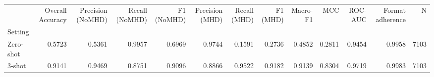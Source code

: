 \begin{tabular}{lrrrrrrrrrrrr}
\toprule
 & Overall Accuracy & Precision (NoMHD) & Recall (NoMHD) & F1 (NoMHD) & Precision (MHD) & Recall (MHD) & F1 (MHD) & Macro-F1 & MCC & ROC-AUC & Format adherence & N \\
Setting &  &  &  &  &  &  &  &  &  &  &  &  \\
\midrule
Zero-shot & 0.5723 & 0.5361 & 0.9957 & 0.6969 & 0.9744 & 0.1591 & 0.2736 & 0.4852 & 0.2811 & 0.9454 & 0.9958 & 7103 \\
3-shot & 0.9141 & 0.9469 & 0.8751 & 0.9096 & 0.8866 & 0.9522 & 0.9182 & 0.9139 & 0.8304 & 0.9719 & 0.9983 & 7103 \\
\bottomrule
\end{tabular}
